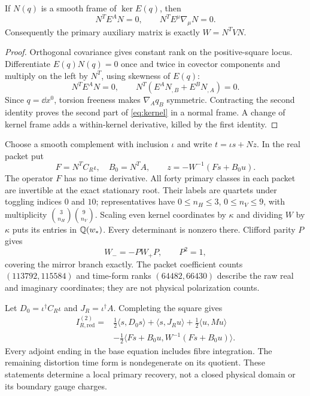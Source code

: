 \begin{lemma}
\label{lem:kernel}
If $N(q)$ is a smooth frame of $\ker E(q)$, then
\begin{equation}
 N^TE^AN=0,\qquad N^TE^\mu\nabla_\mu N=0.\label{eq:kernel}
\end{equation}
Consequently the primary auxiliary matrix is exactly $W=N^TVN$.
\end{lemma}
\begin{proof}
Orthogonal covariance gives constant rank on the positive-square locus.
Differentiate $E(q)N(q)=0$ once and twice in covector components and
multiply on the left by $N^T$, using skewness of $E(q)$:
\[
 N^TE^AN=0,\qquad
 N^T(E^AN_{,B}+E^BN_{,A})=0.
\]
Since $q=\dd x^0$, torsion freeness makes $\nabla_Aq_B$ symmetric.
Contracting the second identity proves the second part of
\eqref{eq:kernel} in a normal frame. A change of kernel frame adds a
within-kernel derivative, killed by the first identity.
\end{proof}

Choose a smooth complement with inclusion $\iota$ and write
$t=\iota s+Nz$. In the real packet put
\begin{equation}
 F=N^TC_R\iota,\quad B_0=N^TA,\qquad
 z=-W^{-1}(Fs+B_0u).\label{eq:primary}
\end{equation}
The operator $F$ has no time derivative. All forty primary classes in
each packet are invertible at the exact stationary root. Their labels
are quartets under toggling indices $0$ and $10$; representatives have
$0\le n_H\le3$, $0\le n_V\le9$, with multiplicity
$\binom3{n_H}\binom9{n_V}$.
Scaling even kernel coordinates by $\kappa$ and dividing $W$ by
$\kappa$ puts its entries in $\mathbb Q(w_*)$. Every determinant is nonzero
there. Clifford parity $P$ gives
\begin{equation}
 W_-=-PW_+P,\qquad P^2=1,\label{eq:Wmirror}
\end{equation}
covering the mirror branch exactly.
The packet coefficient counts $(113792,115584)$ and time-form ranks
$(64482,66430)$ describe the raw real and imaginary coordinates; they
are not physical polarization counts.

Let $D_0=\iota^\dagger C_R\iota$ and $J_R=\iota^\dagger A$.
Completing the square gives
\begin{align}
 I_{R,\mathrm{red}}^{(2)}={}&\tfrac12\langle s,D_0s\rangle
 +\langle s,J_Ru\rangle+\tfrac12\langle u,Mu\rangle\nonumber\\
 &-\tfrac12\langle Fs+B_0u,W^{-1}(Fs+B_0u)\rangle.
 \label{eq:schur}
\end{align}
Every adjoint ending in the base equation includes fibre integration.
The remaining distortion time form is nondegenerate on its quotient.
These statements determine a local primary recovery, not a closed
physical domain or its boundary gauge charges.

